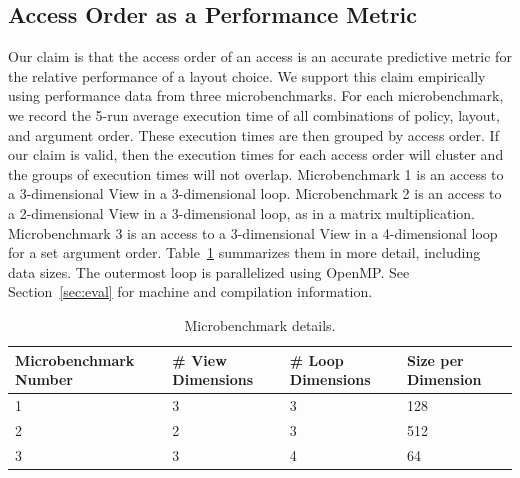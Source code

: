 \documentclass[sigconf,review=true]{acmart}
\begin{document}
\subsection{Access Order as a Performance Metric}
\label{sec:AccessMetric}
Our claim is that the access order of an access is an accurate predictive metric for the relative performance of a layout choice. 
We support this claim empirically using performance data from three microbenchmarks.
For each microbenchmark, we record the 5-run average execution time of all combinations of policy, layout, and argument order. 
These execution times are then grouped by access order.
If our claim is valid, then the execution times for each access order will cluster and the groups of execution times will not overlap.
Microbenchmark 1 is an access to a 3-dimensional View in a 3-dimensional loop. 
Microbenchmark 2 is an access to a 2-dimensional View in a 3-dimensional loop, as in a matrix multiplication.
Microbenchmark 3 is an access to a 3-dimensional View in a 4-dimensional loop for a set argument order.
Table~\ref{MicrobenchmarkDetails} summarizes them in more detail, including data sizes.
The outermost loop is parallelized using OpenMP.
See Section~\ref{sec:eval} for machine and compilation information.

\begin{table}
	\centering
	\begin{tabular}{p{2.2cm}|p{1.6cm}|p{1.6cm}|p{1.5cm}}

		\raggedright Microbenchmark \linebreak Number & \raggedright \# View \linebreak Dimensions & \raggedright \# Loop \linebreak Dimensions & \raggedright Size per \linebreak Dimension \tabularnewline
		\hline
		1 & 3 & 3 & 128 \\
		2 & 2 & 3 & 512 \\
		3 & 3 & 4 & 64 
	\end{tabular}
	\caption{Microbenchmark details.}
	\label{MicrobenchmarkDetails}
\end{table}
\end{document}
